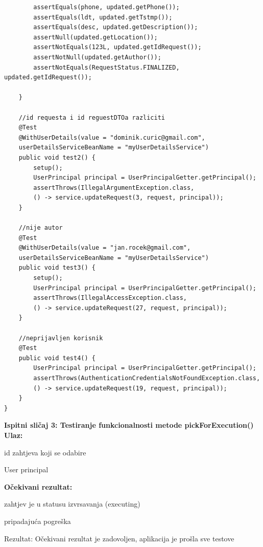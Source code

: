 \begin{verbatim}
		assertEquals(phone, updated.getPhone());
		assertEquals(ldt, updated.getTstmp());
		assertEquals(desc, updated.getDescription());
		assertNull(updated.getLocation());
		assertNotEquals(123L, updated.getIdRequest());
		assertNotNull(updated.getAuthor());
		assertNotEquals(RequestStatus.FINALIZED, updated.getIdRequest());

	}

	//id requesta i id reguestDTOa razliciti
	@Test
	@WithUserDetails(value = "dominik.curic@gmail.com",
	userDetailsServiceBeanName = "myUserDetailsService")
	public void test2() {
		setup();
		UserPrincipal principal = UserPrincipalGetter.getPrincipal();
		assertThrows(IllegalArgumentException.class, 
		() -> service.updateRequest(3, request, principal));
	}

	//nije autor
	@Test
	@WithUserDetails(value = "jan.rocek@gmail.com",
	userDetailsServiceBeanName = "myUserDetailsService")
	public void test3() {
		setup();
		UserPrincipal principal = UserPrincipalGetter.getPrincipal();
		assertThrows(IllegalAccessException.class,
		() -> service.updateRequest(27, request, principal));
	}

	//neprijavljen korisnik
	@Test
	public void test4() {
		UserPrincipal principal = UserPrincipalGetter.getPrincipal();
		assertThrows(AuthenticationCredentialsNotFoundException.class,
		() -> service.updateRequest(19, request, principal));
	}
}
		\end{verbatim}
			
			\medskip
			
			\noindent \textbf{Ispitni sličaj 3: Testiranje funkcionalnosti metode pickForExecution()}\\
			
			\medskip
            \noindent\textbf{Ulaz:}
            \begin{packed_enum}
            \item id zahtjeva koji se odabire
            \item User principal
            \end{packed_enum}
            
            \noindent\textbf{Očekivani rezultat:}
            \begin{packed_enum}
            \item zahtjev je u statusu izvrsavanja (executing)
            \item pripadajuća pogreška
            \end{packed_enum}
            
            \noindent \text
            Rezultat: Očekivani rezultat je zadovoljen, aplikacija je prošla sve testove \\
            
